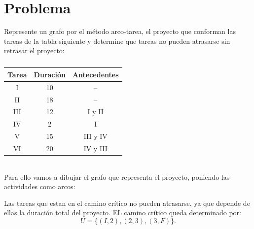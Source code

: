 \documentclass[autocontact]{gaceta}
\begin{document}
\section{Problema}
        Represente un grafo por el método arco-tarea, el proyecto que conforman las tareas de la tabla 
        siguiente y determine que tareas no pueden atrasarse sin retrasar el proyecto:
        \begin{table}[h]
            \begin{center}
            
                \begin{tabular}{|c|c|c|}
                    \hline
                    Tarea & Duración & Antecedentes \\
                    \hline
                    I & 10 & -- \\
                    \hline
                    II & 18 & --\\
                    \hline
                    III & 12 & I y II\\
                    \hline
                    IV & 2 & I \\
                    \hline
                    V & 15 & III y IV \\
                    \hline
                    VI & 20 & IV y III \\
                    \hline
                \end{tabular}   
            
            \end{center}
            \caption{}
        \end{table}
        \\Para ello vamos a dibujar el grafo que representa el proyecto, poniendo las 
        actividades como arcos:

        
        \pagebreak
        Las tareas que estan en el camino crítico no pueden atrasarse, ya que depende de ellas 
        la duración total del proyecto.
        EL camino crítico queda determinado por:
        \begin{equation}
            U = \{ (I,2), (2,3), (3,F) \}.
        \end{equation}
        \pagebreak
\end{document}
